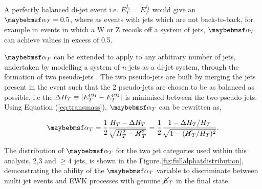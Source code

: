 A perfectly balanced di-jet event i.e. $E_{T}^{j_{1}} = E_{T}^{j_{2}}$ would give an $\alphat = 0.5$, where as events with jets which are not back-to-back, for example in events in which
a W or Z recoils off a system of jets, $\alphat$ can achieve values in excess of 0.5.

$\alphat$ can be extended to apply to any arbitrary number of jets, undertaken by modelling a system of $n$ jets as a di-jet system, through the formation of two pseudo-jets \cite{CMS-PAS-SUS-09-001}. The two pseudo-jets are built by merging the jets present in the event such that the 2 pseudo-jets are chosen to be as balanced as possible, i.e the $\Delta H_{T} \equiv \lvert E_{T}^{pj_{1}} - E_{T}^{pj_{2}}\rvert$ is minimised between the two pseudo jets. Using Equation (\ref{eq:transmass}), $\alphat$ can be rewritten as,

\begin{equation}
\alphat = \frac{1}{2} \frac {\theht - \Delta\theht}{\sqrt{\theht^{2}-\mht^{2}}}= \frac{1}{2}\frac{1-\Delta\theht/\theht}{\sqrt{1-(\mht/\theht)^{2}}}.
\end{equation}

The distribution of $\alphat$ for the two jet categories used within this analysis, 2,3 and $\geq 4$ jets, is shown in the Figure.\ref{fig:fullalphatdistribution}, demonstrating the ability of the $\alphat$ variable to discriminate between multi jet events and \ac{EWK} processes with genuine $\cancel{E}_{T}$ in the final state.  

